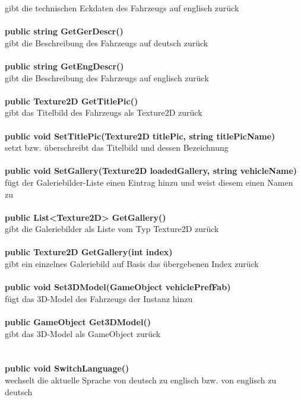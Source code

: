 gibt die technischen Eckdaten des Fahrzeugs auf englisch zurück\\
\\
\textbf{public string GetGerDescr()}\\
gibt die Beschreibung des Fahrzeugs auf deutsch zurück\\
\\
\textbf{public string GetEngDescr()}\\
gibt die Beschreibung des Fahrzeugs auf englisch zurück\\
\\
\textbf{public Texture2D GetTitlePic()}\\
gibt das Titelbild des Fahrzeugs als Texture2D zurück\\
\\
\textbf{public void SetTitlePic(Texture2D titlePic, string titlePicName)}\\
setzt bzw. überschreibt das Titelbild und dessen Bezeichnung\\
\\
\textbf{public void SetGallery(Texture2D loadedGallery, string vehicleName)}\\
fügt der Galeriebilder-Liste einen Eintrag hinzu und weist diesem einen Namen zu\\
\\
\textbf{public List<Texture2D> GetGallery()}\\
gibt die Galeriebilder als Liste vom Typ Texture2D zurück\\
\\
\textbf{public Texture2D GetGallery(int index)}\\
gibt ein einzelnes Galeriebild auf Basis das übergebenen Index zurück\\
\\
\textbf{public void Set3DModel(GameObject vehiclePrefFab)}\\
fügt das 3D-Model des Fahrzeugs der Instanz hinzu\\
\\
\textbf{public GameObject Get3DModel()}\\
gibt das 3D-Model als GameObject zurück\\
%
\section{\lsc}
\label{sec:lsc}
%
\textbf{public void SwitchLanguage()}\\
wechselt die aktuelle Sprache von deutsch zu englisch bzw. von englisch zu deutsch\\
%
